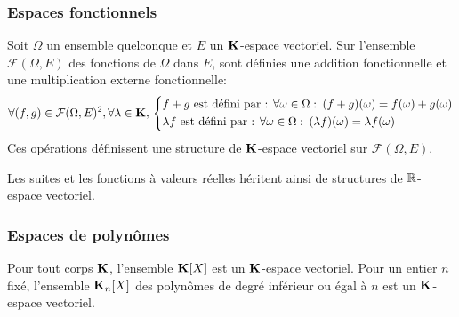 \subsubsection{Espaces fonctionnels}
\begin{prop}
  Soit $\Omega$ un ensemble quelconque et $E$ un $\mathbf{K}$-espace vectoriel. Sur l'ensemble $\mathcal{F}(\Omega,E)$ des fonctions de $\Omega$ dans $E$, sont définies une addition fonctionnelle et une multiplication externe fonctionnelle:
\begin{displaymath}
  \forall(f,g)\in \mathcal{F}(\Omega,E)^2, \forall \lambda \in \mathbf{K},\\
\left\lbrace \begin{aligned}
&f+g \text{ est défini par : }\forall \omega \in \Omega:\: (f+g)(\omega) = f(\omega) + g(\omega)\\
&\lambda f \text{ est défini par : }\forall \omega \in \Omega:\: (\lambda f)(\omega) = \lambda f(\omega)  
\end{aligned} \right. 
\end{displaymath}
Ces opérations définissent une structure de $\mathbf{K}$-espace vectoriel sur $\mathcal{F}(\Omega,E)$.
\end{prop}
Les suites et les fonctions à valeurs réelles héritent ainsi de structures de $\mathbb{R}$-espace vectoriel.

\subsubsection{Espaces de polynômes}
Pour tout corps $\mathbf{K}$, l'ensemble $\mathbf{K}[X]$ est un $\mathbf{K}$-espace vectoriel. Pour un entier $n$ fixé, l'ensemble $\mathbf{K}_n[X]$ des polynômes de degré inférieur ou égal à $n$ est un $\mathbf{K}$-espace vectoriel.

